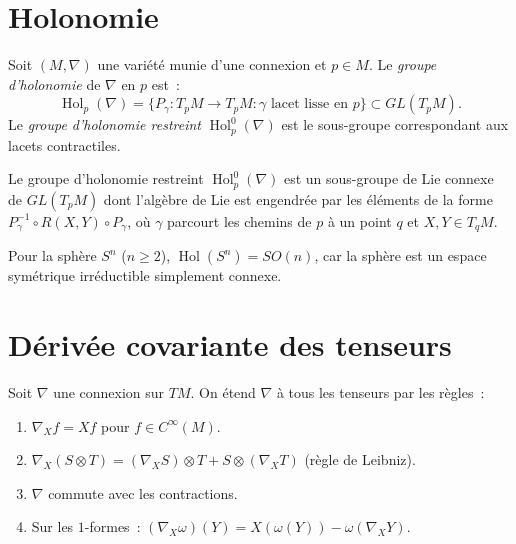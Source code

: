 \section{Holonomie}

\begin{definition}
Soit $(M, \nabla)$ une vari\'et\'e munie d'une connexion et $p \in M$. Le
\emph{groupe d'holonomie} de $\nabla$ en $p$ est~:
\[
    \operatorname{Hol}_p(\nabla) = \{ P_\gamma : T_pM \to T_pM :
    \gamma \text{ lacet lisse en } p \} \subset GL(T_pM).
\]
Le \emph{groupe d'holonomie restreint} $\operatorname{Hol}^0_p(\nabla)$ est le
sous-groupe correspondant aux lacets contractiles.
\end{definition}

\begin{theoreme}
Le groupe d'holonomie restreint $\operatorname{Hol}^0_p(\nabla)$ est un sous-groupe
de Lie connexe de $GL(T_pM)$ dont l'alg\`ebre de Lie est engendr\'ee par les
\'el\'ements de la forme $P_\gamma^{-1} \circ R(X, Y) \circ P_\gamma$,
o\`u $\gamma$ parcourt les chemins de $p$ \`a un point $q$ et $X, Y \in T_qM$.
\end{theoreme}

\begin{exemple}[Holonomie de $S^n$]
Pour la sph\`ere $S^n$ ($n \geq 2$), $\operatorname{Hol}(S^n) = SO(n)$, car la
sph\`ere est un espace sym\'etrique irr\'eductible simplement connexe.
\end{exemple}

\section{D\'eriv\'ee covariante des tenseurs}

\begin{definition}
Soit $\nabla$ une connexion sur $TM$. On \'etend $\nabla$ \`a tous les tenseurs par
les r\`egles~:
\begin{enumerate}
    \item $\nabla_X f = Xf$ pour $f \in C^\infty(M)$.
    \item $\nabla_X(S \otimes T) = (\nabla_X S) \otimes T + S \otimes (\nabla_X T)$
          (r\`egle de Leibniz).
    \item $\nabla$ commute avec les contractions.
    \item Sur les $1$-formes~: $(\nabla_X \omega)(Y) = X(\omega(Y)) - \omega(\nabla_X Y)$.
\end{enumerate}
\end{definition}

